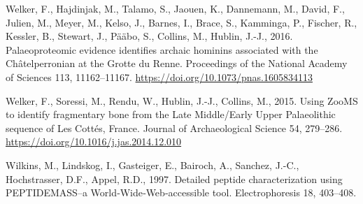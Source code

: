 \documentclass[preprint, 3p, authoryear]{elsarticle} %
\newlength{\cslhangindent}
\newlength{\cslentryspacingunit} %
\newenvironment{CSLReferences}[2] %
 {%
  \setlength{\parindent}{0pt}
  \ifodd #1
  \let\oldpar\par
  \def\par{\hangindent=\cslhangindent\oldpar}
  \fi
  \setlength{\parskip}{#2\cslentryspacingunit}
 }%
 {}
\begin{document}
\begin{CSLReferences}{1}{0}
\leavevmode{}%
Welker, F., Hajdinjak, M., Talamo, S., Jaouen, K., Dannemann, M., David, F., Julien, M., Meyer, M., Kelso, J., Barnes, I., Brace, S., Kamminga, P., Fischer, R., Kessler, B., Stewart, J., Pääbo, S., Collins, M., Hublin, J.-J., 2016. Palaeoproteomic evidence identifies archaic hominins associated with the {Châtelperronian} at the {Grotte} du {Renne}. Proceedings of the National Academy of Sciences 113, 11162--11167. \url{https://doi.org/10.1073/pnas.1605834113}

\leavevmode{}%
Welker, F., Soressi, M., Rendu, W., Hublin, J.-J., Collins, M., 2015. Using {ZooMS} to identify fragmentary bone from the {Late Middle}/{Early Upper Palaeolithic} sequence of {Les Cottés}, {France}. Journal of Archaeological Science 54, 279--286. \url{https://doi.org/10.1016/j.jas.2014.12.010}

\leavevmode{}%
Wilkins, M., Lindskog, I., Gasteiger, E., Bairoch, A., Sanchez, J.-C., Hochstrasser, D.F., Appel, R.D., 1997. Detailed peptide characterization using {PEPTIDEMASS}--a {World}‐{Wide}‐{Web}‐accessible tool. Electrophoresis 18, 403--408.

\end{CSLReferences}
\end{document}

